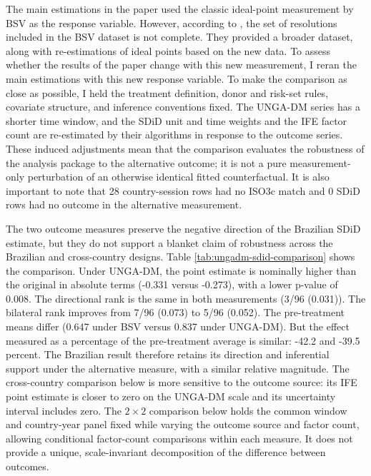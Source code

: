 \documentclass[referee,pdflatex,sn-basic]{sn-jnl}
\theoremstyle{thmstylethree}
\begin{document}
The main estimations in the paper used the classic ideal-point measurement by BSV \citep{bailey_etal2017} as the response variable. However, according to \citet{fjelstul_etal2026}, the set of resolutions included in the BSV dataset is not complete. They provided a broader dataset, along with re-estimations of ideal points based on the new data. To assess whether the results of the paper change with this new measurement, I reran the main estimations with this new response variable. To make the comparison as close as possible, I held the treatment definition, donor and risk-set rules, covariate structure, and inference conventions fixed. The UNGA-DM series has a shorter time window, and the SDiD unit and time weights and the IFE factor count are re-estimated by their algorithms in response to the outcome series. These induced adjustments mean that the comparison evaluates the robustness of the analysis package to the alternative outcome; it is not a pure measurement-only perturbation of an otherwise identical fitted counterfactual. It is also important to note that 28 country-session rows had no ISO3c match and 0 SDiD rows had no outcome in the alternative measurement.

The two outcome measures preserve the negative direction of the Brazilian SDiD estimate, but they do not support a blanket claim of robustness across the Brazilian and cross-country designs. Table \ref{tab:ungadm-sdid-comparison} shows the comparison. Under UNGA-DM, the point estimate is nominally higher than the original in absolute terms (-0.331 versus -0.273), with a lower p-value of 0.008. The directional rank is the same in both measurements (3/96 (0.031)). The bilateral rank improves from 7/96 (0.073) to 5/96 (0.052). The pre-treatment means differ (0.647 under BSV versus 0.837 under UNGA-DM). But the effect measured as a percentage of the pre-treatment average is similar: -42.2 and -39.5 percent. The Brazilian result therefore retains its direction and inferential support under the alternative measure, with a similar relative magnitude. The cross-country comparison below is more sensitive to the outcome source: its IFE point estimate is closer to zero on the UNGA-DM scale and its uncertainty interval includes zero. The \(2\times2\) comparison below holds the common window and country-year panel fixed while varying the outcome source and factor count, allowing conditional factor-count comparisons within each measure. It does not provide a unique, scale-invariant decomposition of the difference between outcomes.
\end{document}
